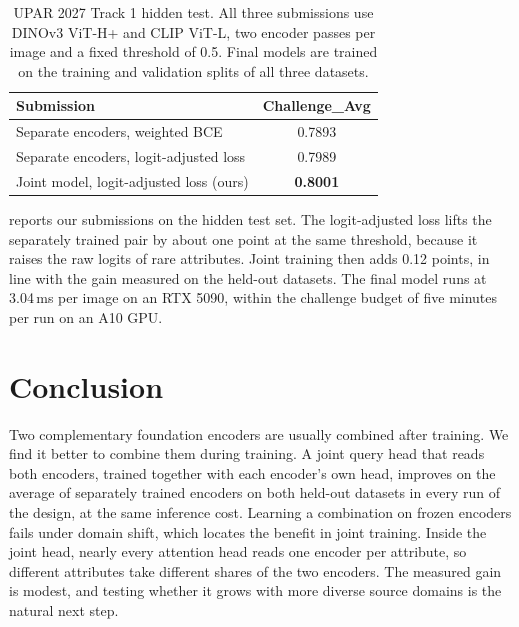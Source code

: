 \documentclass[10pt,twocolumn,letterpaper]{article}
\begin{document}
\begin{table}[t]
\centering
\small
\setlength{\tabcolsep}{4pt}
\begin{tabular}{@{}lc@{}}
\toprule
Submission & Challenge\_Avg \\
\midrule
Separate encoders, weighted BCE & 0.7893 \\
Separate encoders, logit-adjusted loss & 0.7989 \\
Joint model, logit-adjusted loss (ours) & \textbf{0.8001} \\
\bottomrule
\end{tabular}
\caption{UPAR 2027 Track 1 hidden test. All three submissions use DINOv3 ViT-H+ and CLIP ViT-L, two encoder passes per image and a fixed threshold of 0.5. Final models are trained on the training and validation splits of all three datasets.}
\label{tab:test}
\end{table}

 reports our submissions on the hidden test set. The logit-adjusted loss lifts the separately trained pair by about one point at the same threshold, because it raises the raw logits of rare attributes. Joint training then adds 0.12 points, in line with the gain measured on the held-out datasets. The final model runs at 3.04\,ms per image on an RTX 5090, within the challenge budget of five minutes per run on an A10 GPU.

\section{Conclusion}
\label{sec:conclusion}

Two complementary foundation encoders are usually combined after training. We find it better to combine them during training. A joint query head that reads both encoders, trained together with each encoder's own head, improves on the average of separately trained encoders on both held-out datasets in every run of the design, at the same inference cost. Learning a combination on frozen encoders fails under domain shift, which locates the benefit in joint training. Inside the joint head, nearly every attention head reads one encoder per attribute, so different attributes take different shares of the two encoders. The measured gain is modest, and testing whether it grows with more diverse source domains is the natural next step.

{\small


}
\end{document}
